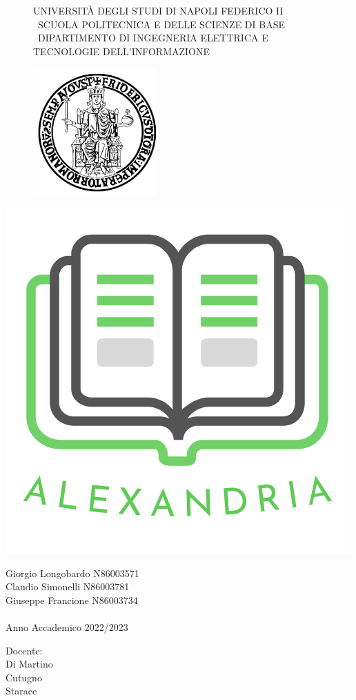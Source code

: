 \documentclass{report}
\begin{document}
    \begin{figure}[htbp!]
    \centering\scshape\Medium UNIVERSITÀ DEGLI STUDI DI NAPOLI FEDERICO II \\
    \centering\scshape\small\ SCUOLA POLITECNICA E DELLE SCIENZE DI BASE\\
    \centering\scshape\Medium\ DIPARTIMENTO DI INGEGNERIA ELETTRICA E TECNOLOGIE DELL'INFORMAZIONE\\
        \begin{center}
            \includegraphics[width=.30\textwidth]{Immagini/FedericoII.png}
        \end{center}
    \end{figure}
         \begin{center}

            \includegraphics[width=.30\textwidth]{Immagini/Alexandria logo nome medium 2.png} 
        \end{center}
        

    \begin{center}


        Giorgio Longobardo N86003571 \\ Claudio Simonelli N86003781\\ Giuseppe Francione N86003734\\~\\ Anno Accademico 2022/2023
    \end{center}
    
\hspace{0pt}
\vfill
    \raggedleft Docente:\\Di Martino\\Cutugno\\Starace
\vfill
\hspace{0pt}


    
    \newpage

    \tableofcontents

    
    
    
    
    
    
    

    
\end{document}
